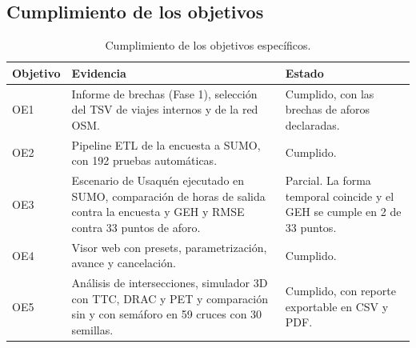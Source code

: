\subsection{Cumplimiento de los objetivos}

\begin{table}[ht]
\renewcommand{\arraystretch}{1.15}
\centering
\small
\begin{tabular}{|p{1.8cm}|p{8cm}|p{4.2cm}|}
\hline
\textbf{Objetivo} & \textbf{Evidencia} & \textbf{Estado} \\ \hline
OE1 & Informe de brechas (Fase 1), selección del TSV de viajes internos y de la red OSM. & Cumplido, con las brechas de aforos declaradas. \\ \hline
OE2 & Pipeline ETL de la encuesta a SUMO, con 192 pruebas automáticas. & Cumplido. \\ \hline
OE3 & Escenario de Usaquén ejecutado en SUMO, comparación de horas de salida contra la encuesta y GEH y RMSE contra 33 puntos de aforo. & Parcial. La forma temporal coincide y el GEH se cumple en 2 de 33 puntos. \\ \hline
OE4 & Visor web con presets, parametrización, avance y cancelación. & Cumplido. \\ \hline
OE5 & Análisis de intersecciones, simulador 3D con TTC, DRAC y PET y comparación sin y con semáforo en 59 cruces con 30 semillas. & Cumplido, con reporte exportable en CSV y PDF. \\ \hline
\end{tabular}
\caption{Cumplimiento de los objetivos específicos.}
\label{tab:objetivos}
\end{table}

